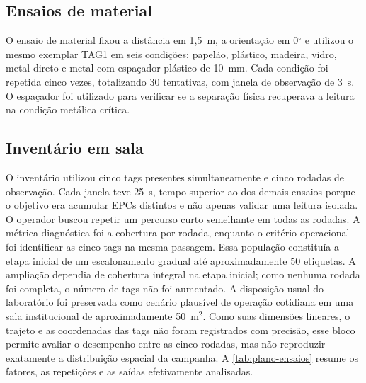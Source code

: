 \subsection{Ensaios de material}

O ensaio de material fixou a distância em 1,5~m, a orientação em 0$^\circ$ e utilizou o mesmo exemplar TAG1 em seis condições: papelão, plástico, madeira, vidro, metal direto e metal com espaçador plástico de 10~mm. Cada condição foi repetida cinco vezes, totalizando 30 tentativas, com janela de observação de 3~s. O espaçador foi utilizado para verificar se a separação física recuperava a leitura na condição metálica crítica.

\subsection{Inventário em sala}

O inventário utilizou cinco tags presentes simultaneamente e cinco rodadas de observação. Cada janela teve 25~s, tempo superior ao dos demais ensaios porque o objetivo era acumular EPCs distintos e não apenas validar uma leitura isolada. O operador buscou repetir um percurso curto semelhante em todas as rodadas. A métrica diagnóstica foi a cobertura por rodada, enquanto o critério operacional foi identificar as cinco tags na mesma passagem. Essa população constituía a etapa inicial de um escalonamento gradual até aproximadamente 50 etiquetas. A ampliação dependia de cobertura integral na etapa inicial; como nenhuma rodada foi completa, o número de tags não foi aumentado. A disposição usual do laboratório foi preservada como cenário plausível de operação cotidiana em uma sala institucional de aproximadamente 50~m$^2$. Como suas dimensões lineares, o trajeto e as coordenadas das tags não foram registrados com precisão, esse bloco permite avaliar o desempenho entre as cinco rodadas, mas não reproduzir exatamente a distribuição espacial da campanha. A \autoref{tab:plano-ensaios} resume os fatores, as repetições e as saídas efetivamente analisadas.

